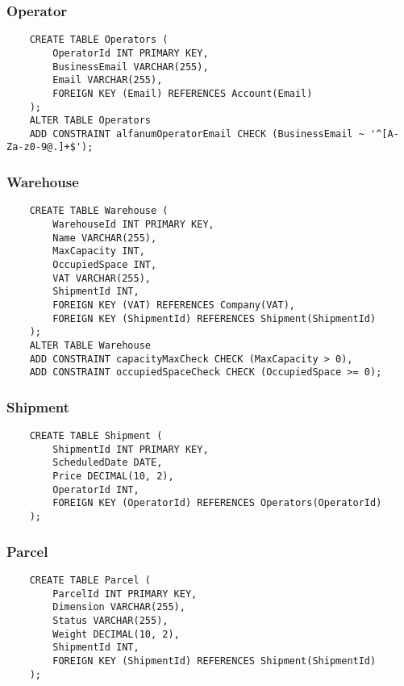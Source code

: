\newpage

\subsubsection{Operator}

\begin{lstlisting}
    CREATE TABLE Operators (
        OperatorId INT PRIMARY KEY,
        BusinessEmail VARCHAR(255),
        Email VARCHAR(255),
        FOREIGN KEY (Email) REFERENCES Account(Email)
    );
    ALTER TABLE Operators
    ADD CONSTRAINT alfanumOperatorEmail CHECK (BusinessEmail ~ '^[A-Za-z0-9@.]+$');
\end{lstlisting}

\subsubsection{Warehouse}

\begin{lstlisting}
    CREATE TABLE Warehouse (
        WarehouseId INT PRIMARY KEY,
        Name VARCHAR(255),
        MaxCapacity INT,
        OccupiedSpace INT,
        VAT VARCHAR(255),
        ShipmentId INT,
        FOREIGN KEY (VAT) REFERENCES Company(VAT),
        FOREIGN KEY (ShipmentId) REFERENCES Shipment(ShipmentId)
    );
    ALTER TABLE Warehouse
    ADD CONSTRAINT capacityMaxCheck CHECK (MaxCapacity > 0),
    ADD CONSTRAINT occupiedSpaceCheck CHECK (OccupiedSpace >= 0);
\end{lstlisting}

\subsubsection{Shipment}

\begin{lstlisting}
    CREATE TABLE Shipment (
        ShipmentId INT PRIMARY KEY,
        ScheduledDate DATE,
        Price DECIMAL(10, 2),
        OperatorId INT,
        FOREIGN KEY (OperatorId) REFERENCES Operators(OperatorId)
    );
\end{lstlisting}

\subsubsection{Parcel}

\begin{lstlisting}
    CREATE TABLE Parcel (
        ParcelId INT PRIMARY KEY,
        Dimension VARCHAR(255),
        Status VARCHAR(255),
        Weight DECIMAL(10, 2),
        ShipmentId INT,
        FOREIGN KEY (ShipmentId) REFERENCES Shipment(ShipmentId)
    );
\end{lstlisting}

